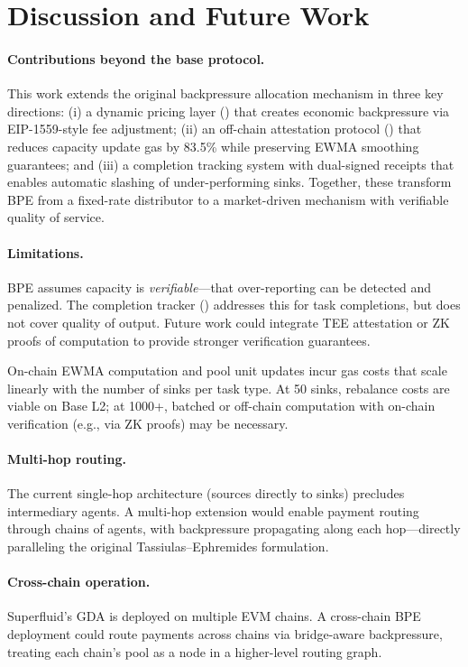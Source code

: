\section{Discussion and Future Work}
\label{sec:discussion}

\paragraph{Contributions beyond the base protocol.}
This work extends the original backpressure allocation mechanism in three key
directions: (i) a dynamic pricing layer () that creates
economic backpressure via EIP-1559-style fee adjustment; (ii) an off-chain
attestation protocol () that reduces capacity update gas by
83.5\% while preserving EWMA smoothing guarantees; and (iii) a completion
tracking system with dual-signed receipts that enables automatic slashing of
under-performing sinks. Together, these transform BPE from a fixed-rate
distributor to a market-driven mechanism with verifiable quality of service.

\paragraph{Limitations.}
BPE assumes capacity is \emph{verifiable}---that over-reporting can be detected
and penalized. The completion tracker () addresses this for
task completions, but does not cover quality of output. Future work could
integrate TEE attestation or ZK proofs of computation to provide stronger
verification guarantees.

On-chain EWMA computation and pool unit updates incur gas costs that scale
linearly with the number of sinks per task type. At 50 sinks, rebalance costs
are viable on Base L2; at 1000+, batched or off-chain computation with
on-chain verification (e.g., via ZK proofs) may be necessary.

\paragraph{Multi-hop routing.}
The current single-hop architecture (sources directly to sinks) precludes
intermediary agents. A multi-hop extension would enable payment routing through
chains of agents, with backpressure propagating along each hop---directly
paralleling the original Tassiulas--Ephremides formulation.

\paragraph{Cross-chain operation.}
Superfluid's GDA is deployed on multiple EVM chains. A cross-chain BPE
deployment could route payments across chains via bridge-aware backpressure,
treating each chain's pool as a node in a higher-level routing graph.

